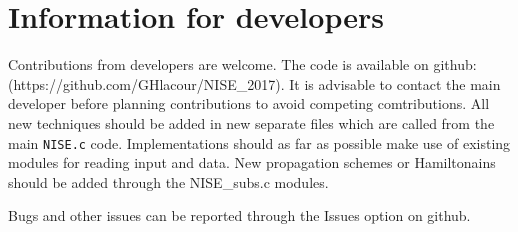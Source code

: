 \chapter{Information for developers\label{chap:developers}}
Contributions from developers are welcome. The code is available on
github:\\ (https://github.com/GHlacour/NISE\_2017). It is advisable to contact the main developer before planning contributions to avoid competing comtributions. All new techniques should be added in new separate files which are called from the main {\tt NISE.c} code. Implementations should as far as possible make use of existing modules for reading input and data. New propagation schemes or Hamiltonains should be added through the {NISE\_subs.c} modules.

Bugs and other issues can be reported through the Issues option on github.
